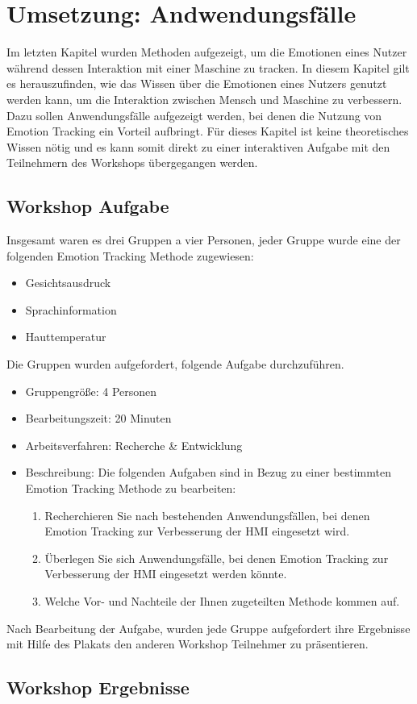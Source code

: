 \section{Umsetzung: Andwendungsfälle}\label{Umsetzung_Anwendungsfaelle}
Im letzten Kapitel wurden Methoden aufgezeigt, um die Emotionen eines Nutzer während dessen Interaktion mit einer Maschine zu tracken. In diesem Kapitel gilt es herauszufinden, wie das Wissen über die Emotionen eines Nutzers genutzt werden kann, um die Interaktion zwischen Mensch und Maschine zu verbessern. Dazu sollen Anwendungsfälle aufgezeigt werden, bei denen die Nutzung von Emotion Tracking ein Vorteil aufbringt. Für dieses Kapitel ist keine theoretisches Wissen nötig und es kann somit direkt zu einer interaktiven Aufgabe mit den Teilnehmern des Workshops übergegangen werden.

\subsection{Workshop Aufgabe}
Insgesamt waren es drei Gruppen a vier Personen, jeder Gruppe wurde eine der folgenden Emotion Tracking Methode zugewiesen:

\begin{itemize}
	\item Gesichtsausdruck
	\item Sprachinformation
	\item Hauttemperatur
\end{itemize}
Die Gruppen wurden aufgefordert, folgende Aufgabe durchzuführen.
\begin{itemize}
	\item Gruppengröße: 4 Personen
	\item Bearbeitungszeit: 20 Minuten
	\item Arbeitsverfahren: Recherche & Entwicklung
	\item Beschreibung: Die folgenden Aufgaben sind in Bezug zu einer bestimmten Emotion Tracking Methode zu bearbeiten:
	\begin{enumerate}
		\item Recherchieren Sie nach bestehenden Anwendungsfällen, bei denen Emotion Tracking zur Verbesserung der HMI eingesetzt wird.
		\item Überlegen Sie sich Anwendungsfälle, bei denen Emotion Tracking zur Verbesserung der HMI eingesetzt werden könnte.
		\item Welche Vor- und Nachteile der Ihnen zugeteilten Methode kommen auf.
	\end{enumerate}
\end{itemize}

Nach Bearbeitung der Aufgabe, wurden jede Gruppe aufgefordert ihre Ergebnisse mit Hilfe des Plakats den anderen Workshop Teilnehmer zu präsentieren.

\subsection{Workshop Ergebnisse}\label{Umsetzung_Anwendungsfaelle_Ergebnisse}